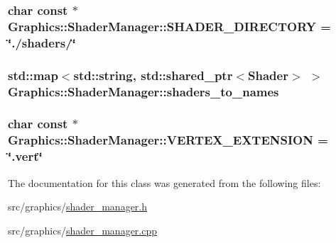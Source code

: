 \subsubsection[{S\+H\+A\+D\+E\+R\+\_\+\+D\+I\+R\+E\+C\+T\+O\+R\+Y}]{\setlength{\rightskip}{0pt plus 5cm}char const $\ast$ Graphics\+::\+Shader\+Manager\+::\+S\+H\+A\+D\+E\+R\+\_\+\+D\+I\+R\+E\+C\+T\+O\+R\+Y = \char`\"{}./shaders/\char`\"{}\hspace{0.3cm}{\ttfamily [static]}}\label{class_graphics_1_1_shader_manager_ad3cef3602a2a0205064bdff0ac9437a8}
\hypertarget{class_graphics_1_1_shader_manager_a5cada9e001d0b2ead2bfb7a0ef37be66}{}
\subsubsection[{shaders\+\_\+to\+\_\+names}]{\setlength{\rightskip}{0pt plus 5cm}std\+::map$<$std\+::string, std\+::shared\+\_\+ptr$<${\bf Shader}$>$ $>$ Graphics\+::\+Shader\+Manager\+::shaders\+\_\+to\+\_\+names\hspace{0.3cm}{\ttfamily [private]}}\label{class_graphics_1_1_shader_manager_a5cada9e001d0b2ead2bfb7a0ef37be66}
\hypertarget{class_graphics_1_1_shader_manager_abb954de5b5b6bc56d568e20b478f0712}{}
\subsubsection[{V\+E\+R\+T\+E\+X\+\_\+\+E\+X\+T\+E\+N\+S\+I\+O\+N}]{\setlength{\rightskip}{0pt plus 5cm}char const $\ast$ Graphics\+::\+Shader\+Manager\+::\+V\+E\+R\+T\+E\+X\+\_\+\+E\+X\+T\+E\+N\+S\+I\+O\+N = \char`\"{}.vert\char`\"{}\hspace{0.3cm}{\ttfamily [static]}}\label{class_graphics_1_1_shader_manager_abb954de5b5b6bc56d568e20b478f0712}


The documentation for this class was generated from the following files\+:\begin{DoxyCompactItemize}
\item 
src/graphics/\hyperlink{shader__manager_8h}{shader\+\_\+manager.\+h}\item 
src/graphics/\hyperlink{shader__manager_8cpp}{shader\+\_\+manager.\+cpp}\end{DoxyCompactItemize}
